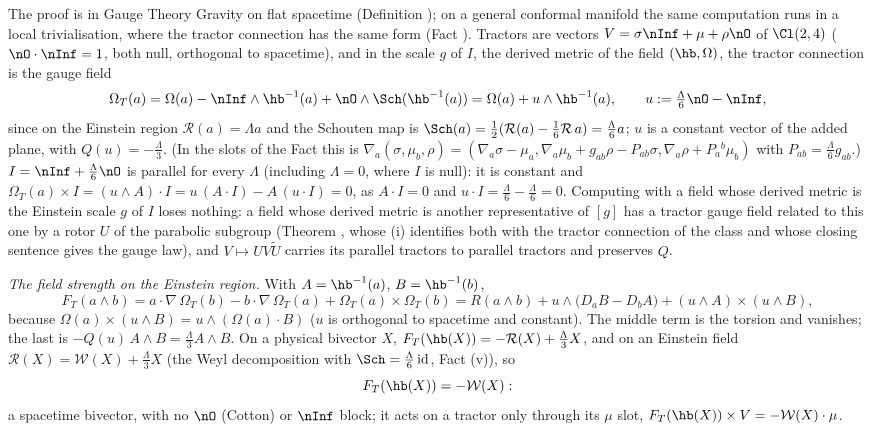 The proof is in Gauge Theory Gravity on flat spacetime (Definition ); on a general conformal manifold the same computation runs in a local trivialisation, where the tractor connection has the same form (Fact ). Tractors are vectors $V = \sigma\nInf + \mu + \rho\nO$ of $\Cl(2,4)$ ($\nO\cdot\nInf = 1$, both null, orthogonal to spacetime), and in the scale $g$ of $I$, the derived metric of the field $(\hb, \Omega)$, the tractor connection is the gauge field
\[
\Omega_{T}(a) = \Omega(a) - \nInf\wedge\hb^{-1}(a) + \nO\wedge\Sch(\hb^{-1}(a)) = \Omega(a) + u\wedge\hb^{-1}(a), \qquad u := \tfrac{\Lambda}{6}\nO - \nInf,
\]
since on the Einstein region $\mathcal{R}(a) = \Lambda a$ and the Schouten map is $\Sch(a) = \tfrac12(\mathcal{R}(a) - \tfrac16\mathcal{R}\,a) = \tfrac{\Lambda}{6}a$; $u$ is a constant vector of the added plane, with $Q(u) = -\tfrac{\Lambda}{3}$. (In the slots of the Fact this is $\nabla_{a}(\sigma, \mu_{b}, \rho) = (\nabla_{a}\sigma - \mu_{a}, \nabla_{a}\mu_{b} + g_{ab}\rho - P_{ab}\sigma, \nabla_{a}\rho + P_{a}{}^{b}\mu_{b})$ with $P_{ab} = \tfrac{\Lambda}{6}g_{ab}$.) $I = \nInf + \tfrac{\Lambda}{6}\nO$ is parallel for every $\Lambda$ (including $\Lambda = 0$, where $I$ is null): it is constant and $\Omega_{T}(a)\times I = (u\wedge A)\cdot I = u\,(A\cdot I) - A\,(u\cdot I) = 0$, as $A\cdot I = 0$ and $u\cdot I = \tfrac{\Lambda}{6} - \tfrac{\Lambda}{6} = 0$. Computing with a field whose derived metric is the Einstein scale $g$ of $I$ loses nothing: a field whose derived metric is another representative of $[g]$ has a tractor gauge field related to this one by a rotor $U$ of the parabolic subgroup (Theorem , whose (i) identifies both with the tractor connection of the class and whose closing sentence gives the gauge law), and $V \mapsto UV\tilde{U}$ carries its parallel tractors to parallel tractors and preserves $Q$.

\emph{The field strength on the Einstein region.} With $A = \hb^{-1}(a)$, $B = \hb^{-1}(b)$,
\[
F_{T}(a\wedge b) = a\cdot\nabla\,\Omega_{T}(b) - b\cdot\nabla\,\Omega_{T}(a) + \Omega_{T}(a)\times\Omega_{T}(b)
= R(a\wedge b) + u\wedge\bigl(D_{a}B - D_{b}A\bigr) + (u\wedge A)\times(u\wedge B),
\]
because $\Omega(a)\times(u\wedge B) = u\wedge(\Omega(a)\cdot B)$ ($u$ is orthogonal to spacetime and constant). The middle term is the torsion and vanishes; the last is $-Q(u)\,A\wedge B = \tfrac{\Lambda}{3}A\wedge B$. On a physical bivector $X$, $F_{T}(\hb(X)) = -\mathcal{R}(X) + \tfrac{\Lambda}{3}X$, and on an Einstein field $\mathcal{R}(X) = \mathcal{W}(X) + \tfrac{\Lambda}{3}X$ (the Weyl decomposition with $\Sch = \tfrac{\Lambda}{6}\,\mathrm{id}$, Fact (v)), so
\[
F_{T}(\hb(X)) = -\mathcal{W}(X):
\]
a spacetime bivector, with no $\nO$ (Cotton) or $\nInf$ block; it acts on a tractor only through its $\mu$ slot, $F_{T}(\hb(X))\times V = -\mathcal{W}(X)\cdot\mu$.

